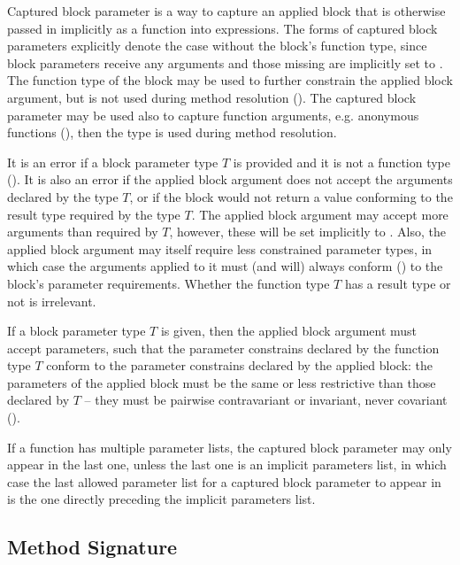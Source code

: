 Captured block parameter is a way to capture an applied block that is otherwise passed in implicitly as a function into  expressions. The forms of captured block parameters explicitly denote the case without the block's function type, since block parameters receive any arguments and those missing are implicitly set to . The function type of the block may be used to further constrain the applied block argument, but is not used during method resolution (). The captured block parameter may be used also to capture function arguments, e.g. anonymous functions (), then the type is used during method resolution. 

It is an error if a block parameter type $T$ is provided and it is not a function type (). It is also an error if the applied block argument does not accept the arguments declared by the type $T$, or if the block would not return a value conforming to the result type required by the type $T$. The applied block argument may accept more arguments than required by $T$, however, these will be set implicitly to . Also, the applied block argument may itself require less constrained parameter types, in which case the arguments applied to it must (and will) always conform () to the block's parameter requirements. Whether the function type $T$ has a result type or not is irrelevant. 

If a block parameter type $T$ is given, then the applied block argument must accept parameters, such that the parameter constrains declared by the function type $T$ conform to the parameter constrains declared by the applied block: the parameters of the applied block must be the same or less restrictive than those declared by $T$ -- they must be pairwise contravariant or invariant, never covariant (). 

If a function has multiple parameter lists, the captured block parameter may only appear in the last one, unless the last one is an implicit parameters list, in which case the last allowed parameter list for a captured block parameter to appear in is the one directly preceding the implicit parameters list. 





\subsection{Method Signature}
\label{sec:method-signature}

